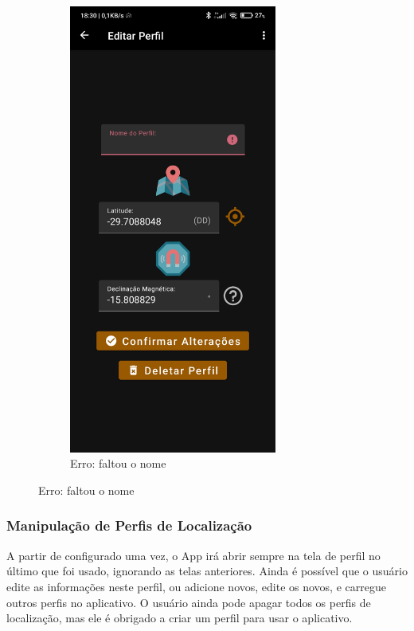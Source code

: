 \begin{figure}[H]
\begin{subfigure}[b]{0.3\textwidth}
		\includegraphics[width=0.75\textwidth]{figuras/desAplicativo/erroescrita}
		\caption{Erro: faltou o nome}
		\label{elev}
	\end{subfigure}
\end{figure}



\subsubsection{Manipulação de Perfis de Localização}
A partir de configurado uma vez, o App irá abrir sempre na tela de perfil no último que foi usado, ignorando as telas anteriores. Ainda é possível que o usuário edite as informações neste perfil, ou adicione novos, edite os novos, e carregue outros perfis no aplicativo. O usuário ainda pode apagar todos os perfis de localização, mas ele é obrigado a criar um perfil para usar o aplicativo.

